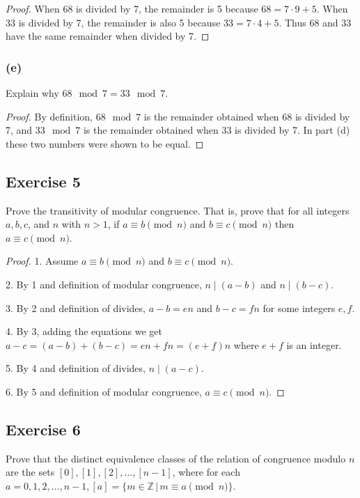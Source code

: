 \documentclass[14pt]{extarticle}
\newcommand{\Z}{\mathbb{Z}}
\begin{document}
\begin{proof}
        When 68 is divided by 7, the remainder is 5 because \(68 = 7 \cdot 9 + 5\). When 33 is divided by 7, the remainder is
        also 5 because \(33 = 7 \cdot 4 + 5\). Thus 68 and 33 have the same remainder when divided by 7.
\end{proof}

\subsubsection{(e)}
Explain why \(68 \mod 7 = 33 \mod 7\).

\begin{proof}
        By definition, \(68 \mod 7\) is the remainder obtained when 68 is divided by 7, and \(33 \mod 7\) is the remainder
        obtained when 33 is divided by 7. In part (d) these two numbers were shown to be equal.
\end{proof}

\subsection{Exercise 5}
Prove the transitivity of modular congruence. That is, prove that for all integers \(a, b, c\), and \(n\) with
\(n > 1\), if \(a \equiv b \pmod n\) and \(b \equiv c \pmod n\) then \(a \equiv c \pmod n\).

\begin{proof}
        1. Assume \(a \equiv b \pmod n\) and \(b \equiv c \pmod n\).

        2. By 1 and definition of modular congruence, \(n \mid (a-b)\) and \(n \mid (b-c)\).

        3. By 2 and definition of divides, \(a-b = en\) and \(b-c = fn\) for some integers \(e,f\).

        4. By 3, adding the equations we get \(a-c = (a-b)+(b-c) = en + fn = (e+f)n\) where \(e+f\) is an integer.

        5. By 4 and definition of divides, \(n \mid (a-c)\).

        6. By 5 and definition of modular congruence, \(a \equiv c \pmod n\).
\end{proof}

\subsection{Exercise 6}
Prove that the distinct equivalence classes of the relation of congruence modulo \(n\) are the sets \([0], [1], [2],
\ldots, [n - 1]\), where for each \(a = 0, 1, 2, \ldots, n - 1, [a] = \{m \in \Z \,|\, m \equiv a \pmod n\}\).
\end{document}
